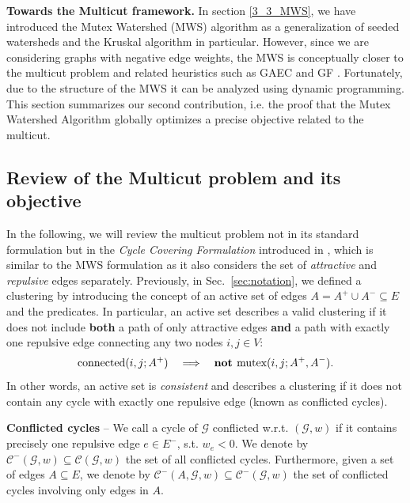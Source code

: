 \noindent \textbf{Towards the Multicut framework.}
In section \ref{3_3_MWS}, we have introduced the Mutex Watershed (MWS) algorithm as a generalization of seeded watersheds and the Kruskal algorithm in particular. 
However, since we are considering graphs with negative edge weights, the MWS is conceptually closer to the multicut problem and related heuristics such as GAEC and GF \cite{levinkov2017comparative}.
Fortunately, due to the structure of the MWS it can be analyzed using dynamic programming. This section summarizes our second contribution, i.e. the proof that the Mutex Watershed Algorithm globally optimizes a precise objective related to the multicut.

\subsection{Review of the Multicut problem and its objective}
In the following, we will review the multicut problem not in its standard formulation but in the \textit{Cycle Covering Formulation} introduced in \cite{lange2018partial}, which is similar to the MWS formulation as it also considers the set of \textit{attractive} and \textit{repulsive} edges separately. 
Previously, in Sec.~\ref{sec:notation}, we defined a clustering by introducing the concept of an active set of edges \mbox{$A=A^+\cup A^-\subseteq E$} and the  predicates. In particular, an active set describes a valid clustering if it does not include \textbf{both} a path of only attractive edges \textbf{and} a path with exactly one repulsive edge connecting any two nodes $i,j\in V$:
\begin{equation}
\textrm{connected}(i, j; A^+) \quad \Longrightarrow \quad \textbf{not } \textrm{mutex}(i, j; A^+,A^-).
\end{equation}
In other words, an active set is \emph{consistent} and describes a clustering if it does not contain any cycle with exactly one repulsive edge (known as conflicted cycles). 

\begin{definition} \label{def:conflicted_cycles}
\textbf{Conflicted cycles} --
We call a cycle of $\mathcal{G}$ conflicted w.r.t. $(\mathcal{G},w)$ if it contains precisely one repulsive edge $e \in E^-$, s.t. $w_e < 0$. We denote by $\mathcal{C}^-(\mathcal{G},w) \subseteq \mathcal{C}(\mathcal{G},w)$ the set of all conflicted cycles. Furthermore, given a set of edges $A \subseteq E$, we denote by $\mathcal{C}^-(A, \mathcal{G},w) \subseteq \mathcal{C}^-(\mathcal{G},w)$ the set of conflicted cycles involving only edges in $A$.
\end{definition}

